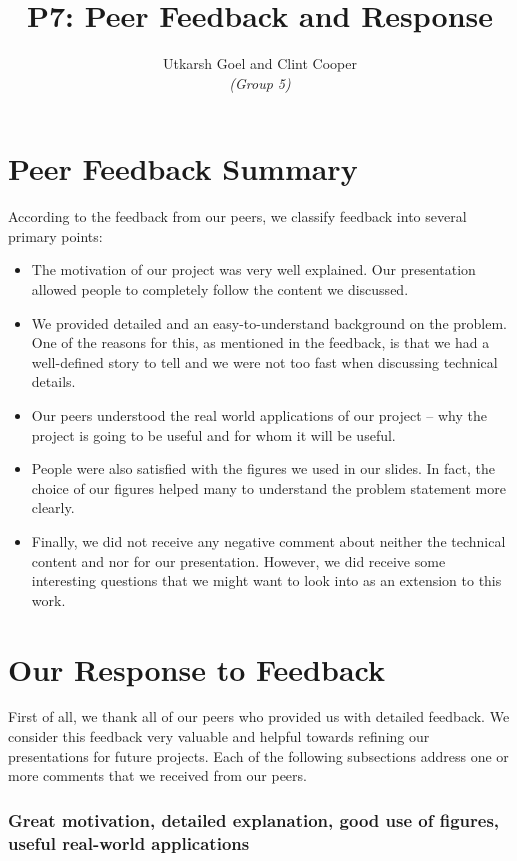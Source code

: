 \documentclass{article}
\title{P7: Peer Feedback and Response}
\author{Utkarsh Goel and Clint Cooper\\ \large \textit{(Group 5)}}
\date{}
\begin{document}
\maketitle

\section{Peer Feedback Summary}
According to the feedback from our peers, we classify feedback into several primary points: 
\begin{itemize}
    \item The motivation of our project was very well explained. 
    Our presentation allowed people to completely follow the content we discussed.
    \item We provided detailed and an easy-to-understand background on the problem.
    One of the reasons for this, as mentioned in the feedback, is that we had a well-defined story to tell and we were not too fast when discussing technical details.
    \item Our peers understood the real world applications of our project -- why the project is going to be useful and for whom it will be useful.
    \item People were also satisfied with the figures we used in our slides. In fact, the choice of our figures helped many to understand the problem statement more clearly.
    \item Finally, we did not receive any negative comment about neither the technical content and nor for our presentation.
    However, we did receive some interesting questions that we might want to look into as an extension to this work.
\end{itemize}

\section{Our Response to Feedback}

First of all, we thank all of our peers who provided us with detailed feedback.
We consider this feedback very valuable and helpful towards refining our presentations for future projects.
Each of the following subsections address one or more comments that we received from our peers.

\subsubsection*{Great motivation, detailed explanation, good use of figures, useful real-world applications}
\end{document}
